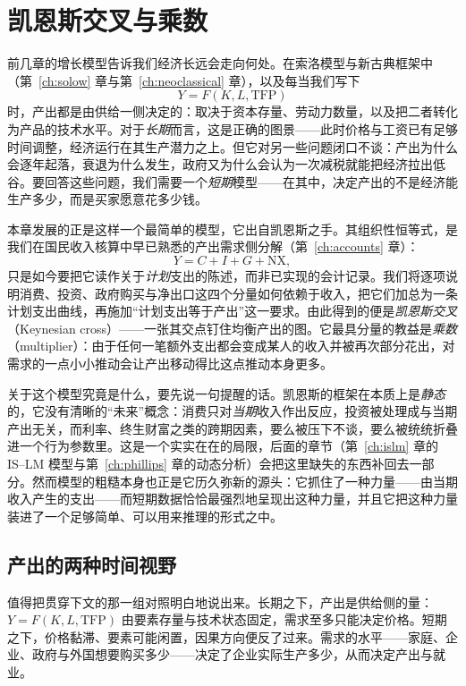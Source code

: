 \chapter{凯恩斯交叉与乘数}
\label{ch:keynes}

前几章的增长模型告诉我们经济长远会走向何处。在索洛模型与新古典框架中（第~\ref{ch:solow} 章与第~\ref{ch:neoclassical} 章），以及每当我们写下
\[
Y = F(K, L, \mathrm{TFP})
\]
时，产出都是由供给一侧决定的：取决于资本存量、劳动力数量，以及把二者转化为产品的技术水平。对于\emph{长期}而言，这是正确的图景——此时价格与工资已有足够时间调整，经济运行在其生产潜力之上。但它对另一些问题闭口不谈：产出为什么会逐年起落，衰退为什么发生，政府又为什么会认为一次减税就能把经济拉出低谷。要回答这些问题，我们需要一个\emph{短期}模型——在其中，决定产出的不是经济能生产多少，而是买家愿意花多少钱。

本章发展的正是这样一个最简单的模型，它出自凯恩斯之手。其组织性恒等式，是我们在国民收入核算中早已熟悉的产出需求侧分解（第~\ref{ch:accounts} 章）：
\[
Y = C + I + G + \mathrm{NX},
\]
只是如今要把它读作关于\emph{计划}支出的陈述，而非已实现的会计记录。我们将逐项说明消费、投资、政府购买与净出口这四个分量如何依赖于收入，把它们加总为一条计划支出曲线，再施加“计划支出等于产出”这一要求。由此得到的便是\emph{凯恩斯交叉}（Keynesian cross）——一张其交点钉住均衡产出的图。它最具分量的教益是\emph{乘数}（multiplier）：由于任何一笔额外支出都会变成某人的收入并被再次部分花出，对需求的一点小小推动会让产出移动得比这点推动本身更多。

关于这个模型究竟是什么，要先说一句提醒的话。凯恩斯的框架在本质上是\emph{静态}的，它没有清晰的“未来”概念：消费只对\emph{当期}收入作出反应，投资被处理成与当期产出无关，而利率、终生财富之类的跨期因素，要么被压下不谈，要么被统统折叠进一个行为参数里。这是一个实实在在的局限，后面的章节（第~\ref{ch:islm} 章的 IS--LM 模型与第~\ref{ch:phillips} 章的动态分析）会把这里缺失的东西补回去一部分。然而模型的粗糙本身也正是它历久弥新的源头：它抓住了一种力量——由当期收入产生的支出——而短期数据恰恰最强烈地呈现出这种力量，并且它把这种力量装进了一个足够简单、可以用来推理的形式之中。

\section{产出的两种时间视野}

值得把贯穿下文的那一组对照明白地说出来。长期之下，产出是供给侧的量：$Y = F(K, L, \mathrm{TFP})$ 由要素存量与技术状态固定，需求至多只能决定价格。短期之下，价格黏滞、要素可能闲置，因果方向便反了过来。需求的水平——家庭、企业、政府与外国想要购买多少——决定了企业实际生产多少，从而决定产出与就业。

